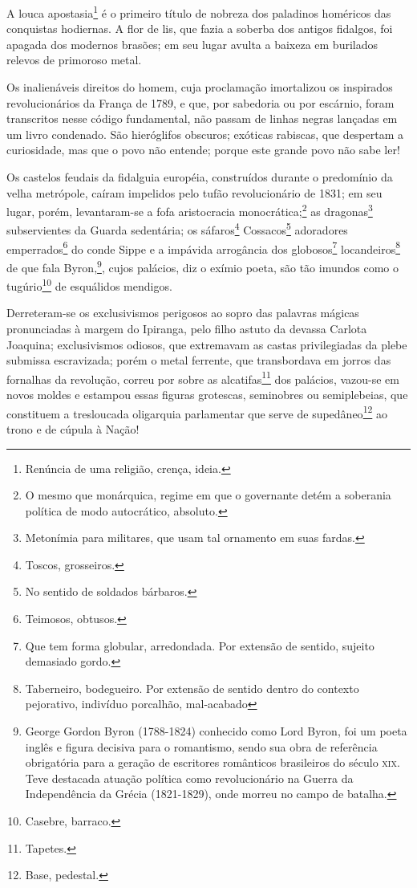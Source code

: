 A louca apostasia\footnote{Renúncia de uma religião, crença, ideia.} é
o primeiro título de nobreza dos paladinos homéricos das conquistas
hodiernas. A flor de lis, que fazia a soberba dos antigos fidalgos, foi
apagada dos modernos brasões; em seu lugar avulta a baixeza em burilados
relevos de primoroso metal.

Os inalienáveis direitos do homem, cuja proclamação imortalizou
os inspirados revolucionários da França de 1789, e que, por
sabedoria ou por escárnio, foram transcritos nesse código fundamental,
não passam de linhas negras lançadas em um livro condenado. São
hieróglifos obscuros; exóticas rabiscas, que despertam a curiosidade,
mas que o povo não entende; porque este grande povo não sabe ler!

Os castelos feudais da fidalguia européia, construídos durante o
predomínio da velha metrópole, caíram impelidos pelo tufão
revolucionário de 1831; em seu lugar, porém, levantaram-se a fofa
aristocracia monocrática;\footnote{O mesmo que monárquica, regime em
  que o governante detém a soberania política de modo autocrático,
  absoluto.} as dragonas\footnote{Metonímia para militares, que usam
  tal ornamento em suas fardas.} subservientes da Guarda sedentária; os
sáfaros\footnote{Toscos, grosseiros.} Cossacos\footnote{No sentido
  de soldados bárbaros.} adoradores emperrados\footnote{Teimosos,
  obtusos.} do conde Sippe e a impávida arrogância dos
globosos\footnote{Que tem forma globular, arredondada. Por extensão de
  sentido, sujeito demasiado gordo.} locandeiros\footnote{Taberneiro,
  bodegueiro. Por extensão de sentido dentro do contexto pejorativo,
  indivíduo porcalhão, mal-acabado} de que fala Byron,\footnote{George
  Gordon Byron (1788-1824) conhecido como Lord Byron, foi um poeta
  inglês e figura decisiva para o romantismo, sendo sua obra de
  referência obrigatória para a geração de escritores românticos
  brasileiros do século \textsc{xix}. Teve destacada atuação política como
  revolucionário na Guerra da Independência da Grécia (1821-1829), onde
  morreu no campo de batalha.}, cujos palácios, diz o exímio poeta, são
tão imundos como o tugúrio\footnote{Casebre, barraco.} de esquálidos
mendigos.

Derreteram-se os exclusivismos perigosos ao sopro das palavras mágicas
pronunciadas à margem do Ipiranga, pelo filho astuto da devassa Carlota
Joaquina; exclusivismos odiosos, que extremavam as castas privilegiadas
da plebe submissa escravizada; porém o metal ferrente, que transbordava
em jorros das fornalhas da revolução, correu por sobre as
alcatifas\footnote{Tapetes.} dos palácios, vazou-se em novos moldes e
estampou essas figuras grotescas, seminobres ou semiplebeias, que
constituem a tresloucada oligarquia parlamentar que serve de
supedâneo\footnote{Base, pedestal.} ao trono e de cúpula à Nação!

